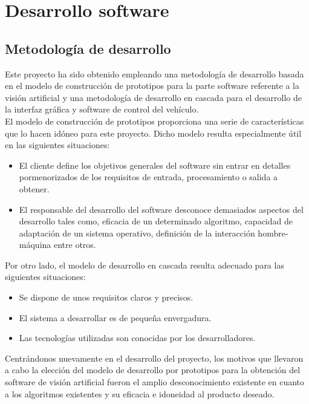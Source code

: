 \documentclass[a4paper,12pt]{article}
\begin{document}
\section{Desarrollo software}

\subsection{Metodología de desarrollo}

Este proyecto ha sido obtenido empleando una metodología de desarrollo basada en el modelo de construcción de prototipos para la parte software referente a la visión artificial y una metodología de desarrollo en cascada para el desarrollo de la interfaz gráfica y software de control del vehículo.\\

El modelo de construcción de prototipos proporciona una serie de características que lo hacen idóneo para este proyecto. Dicho modelo resulta especialmente útil en las siguientes situaciones:

\begin{itemize}
\item El cliente define los objetivos generales del software sin entrar en detalles pormenorizados de los requisitos de entrada, procesamiento o salida a obtener.
\item El responsable del desarrollo del software desconoce demasiados aspectos del desarrollo tales como, eficacia de un determinado algoritmo, capacidad de adaptación de un sistema operativo, definición de la interacción hombre-máquina entre otros.
\end{itemize}

Por otro lado, el modelo de desarrollo en cascada resulta adecuado para las siguientes situaciones:

\begin{itemize}
\item Se dispone de unos requisitos claros y precisos.
\item El sistema a desarrollar es de pequeña envergadura.
\item Las tecnologías utilizadas son conocidas por los desarrolladores.
\end{itemize}

Centrándonos nuevamente en el desarrollo del proyecto, los motivos que llevaron a cabo la elección del modelo de desarrollo por prototipos para la obtención del software de visión artificial fueron el amplio desconocimiento existente en cuanto a los algoritmos existentes y su eficacia e idoneidad al producto deseado. \\
\end{document}
